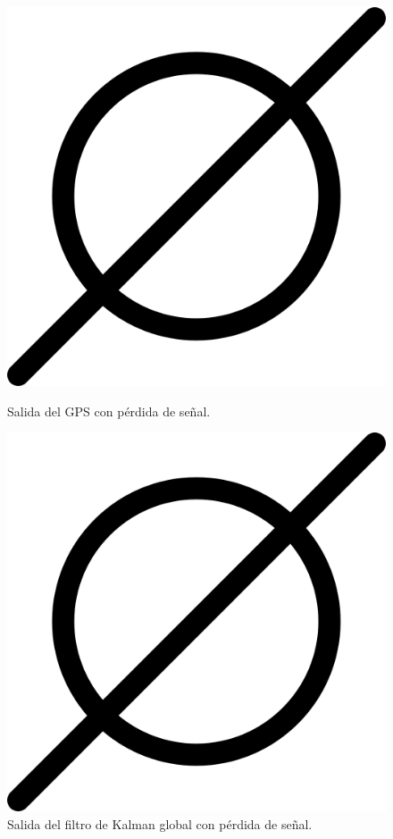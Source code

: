 \begin{figure}[htbp]
  \centering
  \begin{minipage}[b]{0.45\textwidth}
    \centering
    \includegraphics[width=\textwidth]{images/poner_foto.png}
    \caption{Salida del GPS con pérdida de señal.}
    \label{fig:salida_gps_sinrtk}
  \end{minipage}
  \hfill
  \begin{minipage}[b]{0.45\textwidth}
    \centering
    \includegraphics[width=\textwidth]{images/poner_foto.png}
    \caption{Salida del filtro de Kalman global con pérdida de señal.}
    \label{fig:salida_ekf_sinrtk}
  \end{minipage}
\end{figure}

